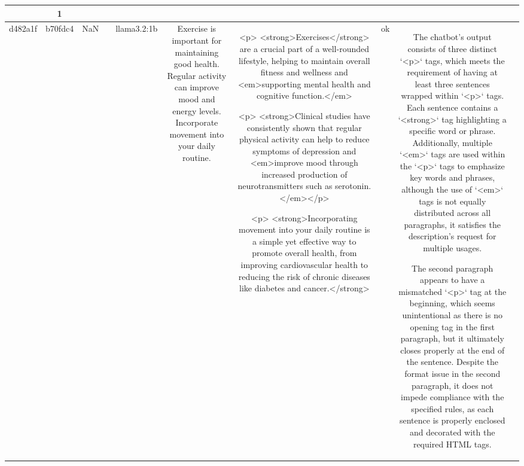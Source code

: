 \begin{table}[h!]
\begin{tabular}{|c|c|c|c|c|c|c|c|c|c|}
{{1. There are three `<p>` tags present in the output, which satisfies the requirement of having at least three `<p>` tags.

2. In each `<p>` tag, there is one `<strong>` tag used, which satisfies the requirement of having at least one `<strong>` tag in each paragraph. 

3. For the `<em>` tags:
   - In the first `<p>`, there are three `<em>` tags.
   - In the second `<p>`, there are no `<em>` tags, which violates the guideline of having multiple `<em>` tags in each paragraph.
   - In the third `<p>`, there are no `<em>` tags as well.

Since multiple `<em>` tags were required in each `<p>` tag, and this isn't met in the second and third `<p>` tags, the output does not comply with the chatbot description.

ERR & 1\\
\hline
d482a1f & b70fdc4 & NaN &  & llama3.2:1b & Exercise is important for maintaining good health. Regular activity can improve mood and energy levels. Incorporate movement into your daily routine. & <p>
<strong>Exercises</strong> are a crucial part of a well-rounded lifestyle, helping to maintain overall fitness and wellness and <em>supporting mental health and cognitive function.</em>

<p>
<strong>Clinical studies have consistently shown that regular physical activity can help to reduce symptoms of depression and <em>improve mood through increased production of neurotransmitters such as serotonin.</em></p>

<p>
<strong>Incorporating movement into your daily routine is a simple yet effective way to promote overall health, from improving cardiovascular health to reducing the risk of chronic diseases like diabetes and cancer.</strong> & ok & The chatbot's output consists of three distinct `<p>` tags, which meets the requirement of having at least three sentences wrapped within `<p>` tags. Each sentence contains a `<strong>` tag highlighting a specific word or phrase. Additionally, multiple `<em>` tags are used within the `<p>` tags to emphasize key words and phrases, although the use of `<em>` tags is not equally distributed across all paragraphs, it satisfies the description’s request for multiple usages. 

The second paragraph appears to have a mismatched `<p>` tag at the beginning, which seems unintentional as there is no opening tag in the first paragraph, but it ultimately closes properly at the end of the sentence. Despite the format issue in the second paragraph, it does not impede compliance with the specified rules, as each sentence is properly enclosed and decorated with the required HTML tags.

}}
\end{tabular}
\end{table}
